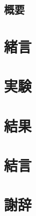 \documentclass[a4paper,12pt,twoside,openright,uplatex,dvipdfmx,titlepage]{jsbook}
\begin{document}


%
\frontmatter
%

\section*{\LARGE 概要}
%

\newpage
%
\tableofcontents
\newpage
\listoffigures
\newpage
%
\mainmatter

\chapter{緒言}


\chapter{実験}
\label{Sec:experiment}



\chapter{結果}
\label{Sec:result}



\chapter{結言}
\label{Sec:conclusion}

%
\backmatter
%
\chapter*{謝辞}



\end{document}
